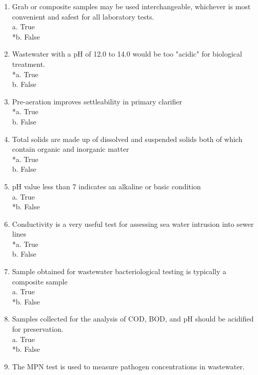 \begin{enumerate}
\item  Grab or composite samples may be used interchangeable, whichever is most convenient and safest for all laboratory tests. \\

a. True \\
*b. False 

\item  Wastewater with a pH of 12.0 to 14.0 would be too "acidic" for biological treatment. \\

*a. True \\
b. False 

\item  Pre-aeration improves settleability in primary clarifier \\

*a. True \\
b. False 

\item  Total solids are made up of dissolved and suspended solids both of which contain organic and inorganic matter \\

*a. True \\
b. False 

\item  pH value less than 7 indicates an alkaline or basic condition \\

a. True \\
*b. False 

\item  Conductivity is a very useful test for assessing sea water intrusion into sewer lines \\

*a. True \\
b. False 


\item  Sample obtained for wastewater bacteriological testing is typically a composite sample \\

a. True \\
*b. False 

\item  Samples collected for the analysis of COD, BOD, and pH should be acidified for preservation. \\

a. True \\
*b. False 

\item  The MPN test is used to measure pathogen concentrations in wastewater. \\


\end{enumerate}

